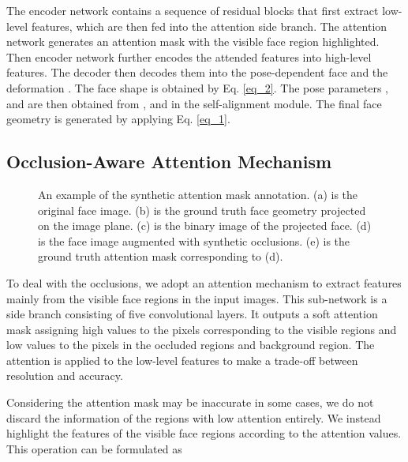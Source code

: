 \documentclass[journal]{IEEEtran}
\begin{document}
	The encoder network contains a sequence of residual blocks that first extract low-level features, which are then fed into the attention side branch. The attention network generates an attention mask  with the visible face region highlighted. Then encoder network further encodes the attended features into high-level features.
	The decoder then decodes them into the pose-dependent face  and the deformation . The face shape  is obtained by Eq. \ref{eq_2}. The pose parameters ,  and  are then obtained from ,  and  in the self-alignment module. The final face geometry  is generated by applying Eq. \ref{eq_1}.
	
	
	\subsection{Occlusion-Aware Attention Mechanism}
	\label{subsec:attention}
	\begin{figure}[tbp]
		
		\centering
		
		\caption{An example of the synthetic attention mask annotation. (a) is the original face image. (b) is the ground truth face geometry projected on the image plane. (c) is the binary image of the projected face. (d) is the face image augmented with synthetic occlusions. (e) is the ground truth attention mask corresponding to (d).}
		\label{fig:synth}
		
	\end{figure}
	
	To deal with the occlusions, we adopt an attention mechanism to extract features mainly from the visible face regions in the input images. This sub-network is a side branch consisting of five convolutional layers. It outputs a soft attention mask assigning high values to the pixels corresponding to the visible regions and low values to the pixels in the occluded regions and background region. The attention is applied to the low-level features to make a trade-off between resolution and accuracy.
	
	Considering the attention mask may be inaccurate in some cases, we do not discard the information of the regions with low attention entirely. We instead highlight the features of the visible face regions according to the attention values. This operation can be formulated as
	
\end{document}
